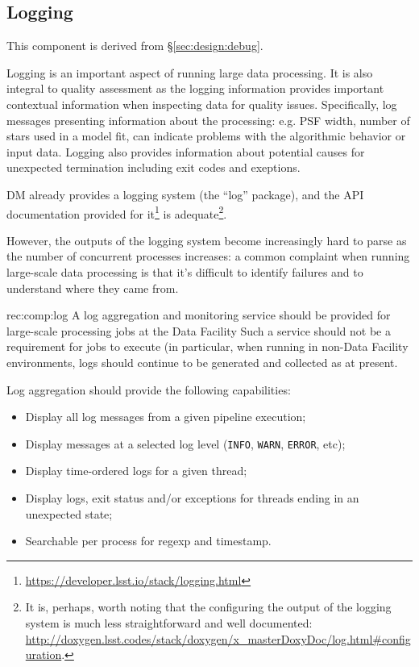 \subsection{Logging}
\label{sec:comp:log}

This component is derived from \S\ref{sec:design:debug}.

Logging is an important aspect of running large data processing.  It is also
integral to quality assessment as the logging information provides important
contextual information when inspecting data for quality issues.  Specifically,
log messages presenting information about the processing: e.g. PSF width,
number of stars used in a model fit, can indicate problems with the
algorithmic behavior or input data.  Logging also provides information about
potential causes for unexpected termination including exit codes and
exeptions.

DM already provides a logging system (the ``log'' package), and the API
documentation provided for
it\footnote{\url{https://developer.lsst.io/stack/logging.html}} is
adequate\footnote{It is, perhaps, worth noting that the configuring the output of the
logging system is much less straightforward and well documented:
\url{http://doxygen.lsst.codes/stack/doxygen/x_masterDoxyDoc/log.html\#configuration}.}.

However, the outputs of the logging system become increasingly hard to parse
as the number of concurrent processes increases: a common complaint when
running large-scale data processing is that it's difficult to identify
failures and to understand where they came from.

\begin{recommendation}
  {rec:comp:log}
  {A log aggregation and monitoring service should be provided for large-scale processing jobs at the Data Facility}
Such a service should not be a requirement for jobs to execute (in particular,
when running in non-Data Facility environments, logs should continue to be
generated and collected as at present.
\end{recommendation}

Log aggregation should provide the following capabilities:

\begin{itemize}
\item{Display all log messages from a given pipeline execution;}
\item{Display messages at a selected log level (\texttt{INFO}, \texttt{WARN}, \texttt{ERROR}, etc);}
\item{Display time-ordered logs for a given thread;}
\item{Display logs, exit status and/or exceptions for threads ending in an unexpected state;}
\item{Searchable per process for regexp and timestamp.}
\end{itemize}

